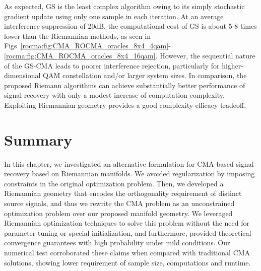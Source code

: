 As expected, GS is the least complex algorithm owing to its simply stochastic gradient update using only one sample in each iteration. 
At an average interference suppression of 20dB, the computational cost of GS is about 5-8 times lower than the Riemannian methods, as seen in Figs~\ref{rocma:fig:CMA_ROCMA_oracles_8x4_4qam}-\ref{rocma:fig:CMA_ROCMA_oracles_8x4_16qam}.
However, the sequential nature of the GS-CMA leads to poorer interference rejection, particularly for higher-dimensional QAM constellation and/or larger system sizes. 
In comparison, the proposed Riemann algorithms can achieve substantially better performance of signal recovery with only a modest increase of computation complexity. 
Exploiting Riemannian geometry provides a good complexity-efficacy tradeoff. 

\section{Summary}
In this chapter, we investigated an alternative formulation for CMA-based signal recovery based on Riemannian manifolds. We avoided regularization by imposing constraints in the original optimization problem. Then, we developed a Riemannian geometry that encodes the orthogonality requirement of distinct source signals, and thus we rewrite the CMA problem as an unconstrained optimization problem over our proposed manifold geometry. We leveraged Riemannian optimization techniques to solve this problem without the need for parameter tuning or special initialization, and furthermore, provided theoretical convergence guarantees with high probability under mild conditions. Our numerical test corroborated these claims when compared with traditional CMA solutions, showing lower requirement of sample size, computations and runtime.